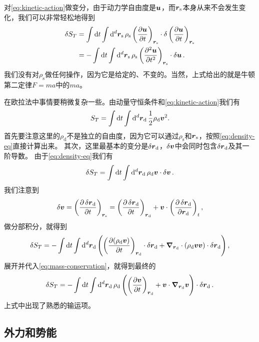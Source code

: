 对\eqref{eq:kinetic-action}做变分，由于动力学自由度是$\vb*{u}$，而$\vb*{r}_\text{s}$本身从来不会发生变化，我们可以非常轻松地得到
\begin{equation}
    \begin{aligned}
        \var{S_T} &= \int \dd{t} \int \dd[d]{\vb*{r}_\text{s}}  \rho_\text{s} \left( \pdv{\vb*{u}}{t} \right)_{\vb*{r}_\text{s}} \cdot \var{\left( \pdv{\vb*{u}}{t} \right)_{\vb*{r}_\text{s}}} \\
        &= - \int \dd{t} \int \dd[d]{\vb*{r}_\text{s}}  \rho_\text{s} \left( \pdv[2]{\vb*{u}}{t} \right)_{\vb*{r}_\text{s}} \cdot \var{\vb*{u}}.
    \end{aligned}
\end{equation}
我们没有对$\rho_\text{s}$做任何操作，因为它是给定的、不变的。当然，上式给出的就是牛顿第二定律$F=ma$中的$ma$。

在欧拉法中事情要稍微复杂一些。由动量守恒条件和\eqref{eq:kinetic-action}我们有
\begin{equation}
    S_T = \int \dd{t} \int \dd[d]{\vb*{r}_\text{d}} \frac{1}{2} \rho_\text{d} \vb*{v}^2.
\end{equation}
首先要注意这里的$\rho_\text{d}$不是独立的自由度，因为它可以通过$\rho_\text{s}$和$\vb*{r}_\text{s}$，按照\eqref{eq:density-eq}直接计算出来。
其次，这里最基本的变分是$\var{\vb*{r}_\text{d}}$，$\var{\vb*{v}}$中会同时包含$\var{\vb*{r}_\text{d}}$及其一阶导数。
由于\eqref{eq:density-eq}我们有
\[
    \var{S_T} = \int \dd{t} \int \dd[d]{\vb*{r}_\text{d}} \rho_\text{d} \vb*{v} \cdot \var{\vb*{v}}.
\]
我们注意到
\[
    \var{\vb*{v}} = \left( \pdv{\var{\vb*{r}_\text{d}}}{t} \right)_{\vb*{r}_\text{s}} = \left( \pdv{\var{\vb*{r}_\text{d}}}{t} \right)_{\vb*{r}_\text{d}} + \vb*{v} \cdot \left(\pdv{\var{\vb*{r}_\text{d}}}{\vb*{r}_\text{d}}\right)_t,
\]
做分部积分，就得到
\[
    \var{S_T} = - \int \dd{t} \int \dd[d]{\vb*{r}_\text{d}} \left( \left(\pdv{(\rho_\text{d} \vb*{v})}{t}\right)_{\vb*{r}_\text{d}} \cdot \var{\vb*{r}_\text{d}} + \grad_{\vb*{r}_\text{d}} \cdot (\rho_\text{d} \vb*{v} \vb*{v}) \cdot \var{\vb*{r}_\text{d}} \right),
\]
展开并代入\eqref{eq:mass-conservation}，就得到最终的
\begin{equation}
    \var{S_T} = - \int \dd{t} \int \dd[d]{\vb*{r}_\text{d}}  \rho_\text{d} \left( \left(\pdv{\vb*{v}}{t}\right)_{\vb*{r}_\text{d}} + \vb*{v} \cdot \grad_{\vb*{r}_\text{d}} \vb*{v} \right) \cdot \var{\vb*{r}_\text{d}}.
\end{equation}
上式中出现了熟悉的输运项。

\subsection{外力和势能}

